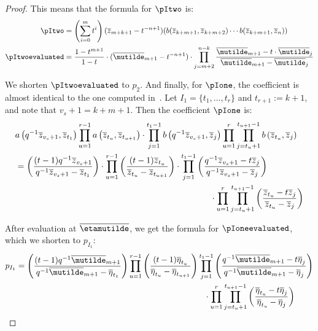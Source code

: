 \begin{proof}
This means that the formula for $\pItwo$ is:
\begin{align*} \pItwo &= \left( \sum_{i=0}^{m} t^i \right) (\overline{z}_{m+k+1}-t^{-n+1}) (b(\overline{z}_{k+m+1},\overline{z}_{k+m+2}) \dotsm b(\overline{z}_{k+m+1}, \overline{z}_{n}))\\
\pItwoevaluated&=\frac{1-t^{m+1}}{1-t}\cdot (\overline{\mutilde}_{m+1} - t^{-n+1}) \cdot \prod_{j=m+2}^{n-k} \frac{\overline{\mutilde}_{m+1} - t \cdot \overline{\mutilde}_j}{\overline{\mutilde}_{m+1} - \overline{\mutilde}_j}\end{align*}

We shorten $\pItwoevaluated$ to $p_{2}$. And finally, for $\pIone$, the coefficient is almost identical to the one computed in~\cite{MR2525842}. Let $I_1 = \{ t_1, \dotsc, t_r \}$ and $t_{r+1}:= k+1$, and note that $v_s+1 = k+m+1$. Then the coefficient $\pIone$ is:
\begin{align*}
     & a\left(q^{-1} \overline{z}_{v_s+1}, \overline{z}_{t_1} \right) \prod_{u=1}^{r-1} a \left(\overline{z}_{t_u},\overline{z}_{t_{u+1}} \right) \cdot \prod_{j=1}^{t_1-1} b \left(q^{-1}\overline{z}_{v_s+1}, \overline{z}_j \right) \prod_{u=1}^{r} \prod_{j=t_u+1}^{t_{u+1}-1} b \left( \overline{z}_{t_u},\overline{z}_j\right)\\
    &=\left(\frac{(t-1)q^{-1} \overline{z}_{v_s+1}}{q^{-1} \overline{z}_{v_s+1}-\overline{z}_{t_1}}\right) \cdot \prod_{u=1}^{r-1} \left(\frac{(t-1) \overline{z}_{t_u}}{ \overline{z}_{t_u}-\overline{z}_{t_{u+1}}} \right) \cdot \prod_{j=1}^{t_1-1} \left( \frac{q^{-1} \overline{z}_{v_s+1} - t \overline{z}_j}{q^{-1} \overline{z}_{v_s+1} -  \overline{z}_j}\right) \\ & \hspace*{8cm} \cdot  \prod_{u=1}^{r} \prod_{j=t_u+1}^{t_{u+1}-1} \left( \frac{\overline{z}_{t_u} - t \overline{z}_j}{ \overline{z}_{t_u} -  \overline{z}_j} \right)
\end{align*}

After evaluation at $\overline{\etamutilde}$, we get the formula for $\pIoneevaluated$, which we shorten to $p_{I_1}$:
\begin{align*} p_{I_1} &=  \left( \frac{(t-1)q^{-1} \overline{\mutilde}_{m+1}}{q^{-1} \overline{\mutilde}_{m+1}-\overline{\eta}_{t_1}} \right) \prod_{u=1}^{r-1} \left(\frac{(t-1) \overline{\eta}_{t_u}}{ \overline{\eta}_{t_u}-\overline{\eta}_{t_{u+1}}}\right)  \prod_{j=1}^{t_1-1} \left( \frac{q^{-1} \overline{\mutilde}_{m+1} - t \overline{\eta}_j}{q^{-1} \overline{\mutilde}_{m+1} -  \overline{\eta}_j} \right) \\ &\hspace*{8cm} \cdot \prod_{u=1}^{r} \prod_{j=t_u+1}^{t_{u+1}-1}  \left(\frac{\overline{\eta}_{t_u} - t \overline{\eta}_j}{ \overline{\eta}_{t_u} -  \overline{\eta}_j} \right)\end{align*}



\end{proof}
